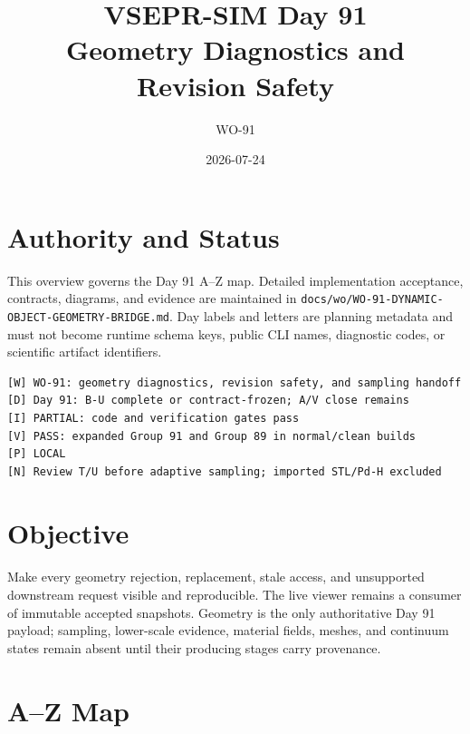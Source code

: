 \documentclass[10pt]{article}
\title{VSEPR-SIM Day 91\\Geometry Diagnostics and Revision Safety}
\author{WO-91}
\date{2026-07-24}
\begin{document}
\maketitle

\section*{Authority and Status}

This overview governs the Day 91 A--Z map. Detailed implementation acceptance,
contracts, diagrams, and evidence are maintained in
\texttt{docs/wo/WO-91-DYNAMIC-OBJECT-GEOMETRY-BRIDGE.md}. Day labels and
letters are planning metadata and must not become runtime schema keys, public
CLI names, diagnostic codes, or scientific artifact identifiers.

\begin{verbatim}
[W] WO-91: geometry diagnostics, revision safety, and sampling handoff
[D] Day 91: B-U complete or contract-frozen; A/V close remains
[I] PARTIAL: code and verification gates pass
[V] PASS: expanded Group 91 and Group 89 in normal/clean builds
[P] LOCAL
[N] Review T/U before adaptive sampling; imported STL/Pd-H excluded
\end{verbatim}

\section*{Objective}

Make every geometry rejection, replacement, stale access, and unsupported
downstream request visible and reproducible. The live viewer remains a consumer
of immutable accepted snapshots. Geometry is the only authoritative Day 91
payload; sampling, lower-scale evidence, material fields, meshes, and continuum
states remain absent until their producing stages carry provenance.

\section*{A--Z Map}
\end{document}

